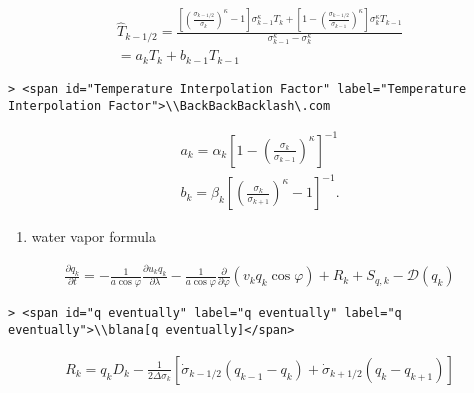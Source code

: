 \begin{eqnarray}
  \hat{T}_{k-1/2}
   =  \frac{ \left[ \left( \frac{ \sigma_{k-1/2} }
                               { \sigma_k } \right)^{\kappa}
                  - 1 \right] \sigma_{k-1}^{\kappa} T_k 
          + \left[ 1- 
                   \left( \frac{ \sigma_{k-1/2} }
                               { \sigma_{k-1} } \right)^{\kappa}
                      \right] \sigma_k^{\kappa} T_{k-1}         }
          { \sigma_{k-1}^{\kappa} - \sigma_k^{\kappa}           } \\
   =  a_k T_k + b_{k-1} T_{k-1}
\end{eqnarray}

\begin{verbatim}
> <span id="Temperature Interpolation Factor" label="Temperature Interpolation Factor">\\BackBackBacklash\.com
\end{verbatim}

\begin{eqnarray}
  a_k  =  \alpha_k 
              \left[ 1- \left( \frac{ \sigma_k }{ \sigma_{k-1} }
                        \right)^{\kappa} \right]^{-1}   \\
  b_k  =  \beta_k 
              \left[ \left( \frac{ \sigma_k }{ \sigma_{k+1} } 
                     \right)^{\kappa} - 1 \right]^{-1} .  
\end{eqnarray}

\begin{enumerate}
\def\labelenumi{\arabic{enumi}.}
\setcounter{enumi}{4}
\tightlist
\item
  water vapor formula
\end{enumerate}

\begin{eqnarray}
  \frac{\partial q_k}{\partial t}
      =   - \frac{1}{a\cos\varphi} 
               \frac{\partial u_k q_k}{\partial \lambda}
          - \frac{1}{a\cos\varphi}
               \frac{\partial }{\partial \varphi} ( v_k q_k\cos\varphi)
          + R_k 
          + S_{q,k}
          - {\mathcal D}(q_k) 
\end{eqnarray}

\begin{verbatim}
> <span id="q eventually" label="q eventually" label="q eventually">\\blana[q eventually]</span>
\end{verbatim}

\begin{eqnarray}
R_k  =  q_k D_k 
       - \frac{1}{2 \Delta \sigma_k} 
             [   \dot{\sigma}_{k-1/2} ( q_{k-1} - q_k   )
               + \dot{\sigma}_{k+1/2} ( q_k   - q_{k+1} ) ]
\end{eqnarray}
